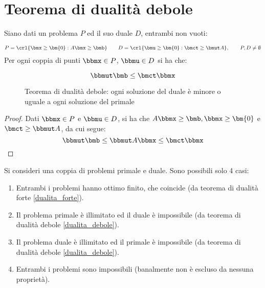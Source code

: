 \documentclass[\main/main.tex]{subfiles}
\begin{document}
\section{Teorema di dualità debole}
\begin{theorem}
  \label{dualita_debole}
  Siano dati un problema $P$ ed il suo duale $D$, entrambi non vuoti:

  \[
    P = \crl{\bmx \geq \bm{0}: A\bmx \geq \bmb} \qquad D = \crl{\bmu \geq \bm{0}: \bmct \geq \bmut A}, \qquad P, D \neq \emptyset
  \]
  Per ogni coppia di punti $\bbmx \in P$, $\bbmu \in D$ si ha che:

  \begin{figure}
    \[
      \bbmut \bmb \leq \bmct\bbmx
    \]
    \caption{Teorema di dualità debole: ogni soluzione del duale è minore o uguale a ogni soluzione del primale}
  \end{figure}
\end{theorem}

\begin{proof}
  Dati $\bbmx \in P$ e $\bbmu \in D$, si ha che $A\bbmx \geq \bmb, \bbmx \geq \bm{0}$ e $\bmct \geq \bbmut A$, da cui segue:
  \[
    \bbmut \bmb \leq \bbmut A \bbmx \leq \bmct \bbmx
  \]
\end{proof}

\begin{corollary}
  Si consideri una coppia di problemi primale e duale. Sono possibili solo 4 casi:
  \begin{enumerate}
    \item Entrambi i problemi hanno ottimo finito, che coincide (da teorema di dualità forte \ref{dualita_forte}).
    \item Il problema primale è illimitato ed il duale è impossibile (da teorema di dualità debole \ref{dualita_debole}).
    \item Il problema duale è illimitato ed il primale è impossibile (da teorema di dualità debole \ref{dualita_debole}).
    \item Entrambi i problemi sono impossibili (banalmente non è escluso da nessuna proprietà).
  \end{enumerate}
\end{corollary}
\end{document}
